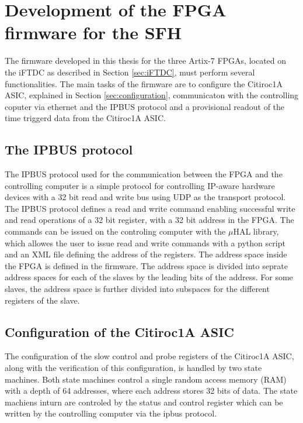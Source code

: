 \chapter{Development of the FPGA firmware for the SFH}\label{cha:development}
The firmware developed in this thesis for the three Artix-7 FPGAs, located on the iFTDC as described in Section \ref{sec:iFTDC}, must perform several functionalities.
The main tasks of the firmware are to configure the Citiroc1A ASIC, explained in Section \ref{sec:configuration},
 communicaton with the controlling coputer via ethernet and the IPBUS protocol and a provisional readout of the time triggerd data from the Citiroc1A ASIC.
\section{The IPBUS protocol}
The IPBUS protocol used for the communication between the FPGA and the controlling computer is a simple protocol for controlling IP-aware hardware devices with a 32 bit read and write bus using UDP as the transport protocol.\autocite{IPBUS_article}
\newline
The IPBUS protocol defines a read and write command enabling successful write and read operations of a 32 bit register, with a 32 bit address in the FPGA.    
\newline
The commands can be issued on the controling computer with the $\mu$HAL library, which allowes the user to issue read and write commands with a python script and an XML file defining the address of the registers.\autocite{IPBUS_article}
\newline
The address space inside the FPGA is defined in the firmware. The address space is divided into seprate address spaces for each of the slaves by the leading bits of the address.
For some slaves, the address space is further divided into subspaces for the different registers of the slave. 
\section{Configuration of the Citiroc1A ASIC}
The configuration of the slow control and probe registers of the Citiroc1A ASIC,
 along with the verification of this configuration, is handled by two state machines. Both state machines control a single random access memory (RAM) with a depth of 64 addresses, where each address stores 32 bits of data.
The state machiens inturn are controled by the status and control register which can be written by the controlling computer via the ipbus protocol.
